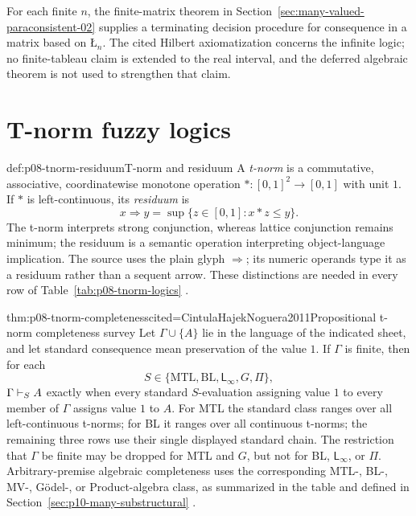 For each finite \(n\), the finite-matrix theorem in Section~\ref{sec:many-valued-paraconsistent-02} supplies a
terminating decision procedure for consequence in a matrix based on
\(\text{\L}_n\).  The cited
Hilbert axiomatization concerns the infinite logic; no finite-tableau claim is
extended to the real interval, and the deferred algebraic theorem is not used
to strengthen that claim.

\section{T-norm fuzzy logics}

\begin{hbdefinition}{def:p08-tnorm-residuum}{T-norm and residuum}
A \emph{t-norm} is a commutative, associative, coordinatewise monotone
operation \(\ast:[0,1]^2\to[0,1]\) with unit \(1\).  If \(\ast\) is
left-continuous, its \emph{residuum} is
\[
  x\Rightarrow y
  =\sup\{z\in[0,1]:x\ast z\leq y\}.
\]
The t-norm interprets strong conjunction, whereas lattice conjunction remains
minimum; the residuum is a semantic operation interpreting object-language
implication.  The source uses the plain glyph \(\Rightarrow\); its numeric
operands type it as a residuum rather than a sequent arrow.  These distinctions
are needed in every row of Table~\ref{tab:p08-tnorm-logics}
\cite{Hajek1998,CintulaHajekNoguera2011}.
\end{hbdefinition}

\begin{hbtheorem}{thm:p08-tnorm-completeness}{cited=CintulaHajekNoguera2011}{Propositional t-norm completeness survey}
Let \(\Gamma\cup\{A\}\) lie in the language of the indicated sheet, and let
standard consequence mean preservation of the value \(1\).  If \(\Gamma\) is
finite, then for each
\[
 S\in\{\mathrm{MTL},\mathrm{BL},\mathsf L_{\infty},G,\Pi\},
\]
\(\Gamma\vdash_S A\) exactly when every standard \(S\)-evaluation assigning
value \(1\) to every member of \(\Gamma\) assigns value \(1\) to \(A\).
For MTL the standard class ranges over all left-continuous t-norms; for BL it
ranges over all continuous t-norms; the remaining three rows use their single
displayed standard chain.  The restriction that \(\Gamma\) be finite may be
dropped for MTL and \(G\), but not for BL, \(\mathsf L_{\infty}\), or
\(\Pi\).  Arbitrary-premise algebraic completeness uses the corresponding
MTL-, BL-, MV-, G\"odel-, or Product-algebra class, as summarized in the table
and defined in Section~\ref{sec:p10-many-substructural}
\cite{Hajek1998,CignoliEstevaGodoTorrens2000,JeneiMontagna2002}.
\end{hbtheorem}

